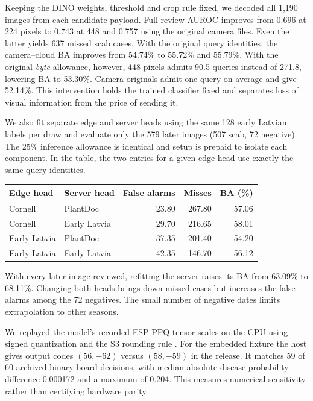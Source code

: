 \newpage
{}
Keeping the DINO weights, threshold and crop rule fixed, we decoded all 1,190 images from each candidate payload. Full-review AUROC improves from 0.696 at 224 pixels to 0.743 at 448 and 0.757 using the original camera files. Even the latter yields 637 missed scab cases. With the original query identities, the camera--cloud BA improves from 54.74\% to 55.72\% and 55.79\%. With the original \emph{byte} allowance, however, 448 pixels admits 90.5 queries instead of 271.8, lowering BA to 53.30\%. Camera originals admit one query on average and give 52.14\%. This intervention holds the trained classifier fixed and separates loss of visual information from the price of sending it.

We also fit separate edge and server heads using the same 128 early Latvian labels per draw and evaluate only the 579 later images (507 scab, 72 negative). The 25\% inference allowance is identical and setup is prepaid to isolate each component. In the table, the two entries for a given edge head use exactly the same query identities.
\begin{center}\small
\begin{tabular}{@{}llrrr@{}}\toprule
Edge head & Server head & False alarms & Misses & BA (\%)\\\midrule
Cornell & PlantDoc & 23.80 & 267.80 & 57.06\\
Cornell & Early Latvia & 29.70 & 216.65 & 58.01\\
Early Latvia & PlantDoc & 37.35 & 201.40 & 54.20\\
Early Latvia & Early Latvia & 42.35 & 146.70 & 56.12\\\bottomrule
\end{tabular}\end{center}
With every later image reviewed, refitting the server raises its BA from 63.09\% to 68.11\%. Changing both heads brings down missed cases but increases the false alarms among the 72 negatives. The small number of negative dates limits extrapolation to other seasons.

We replayed the model's recorded ESP-PPQ tensor scales on the CPU using signed quantization and the S3 rounding rule \cite{esp}. For the embedded fixture the host gives output codes $(56,-62)$ versus $(58,-59)$ in the release. It matches 59 of 60 archived binary board decisions, with median absolute disease-probability difference 0.000172 and a maximum of 0.204. This measures numerical sensitivity rather than certifying hardware parity.

